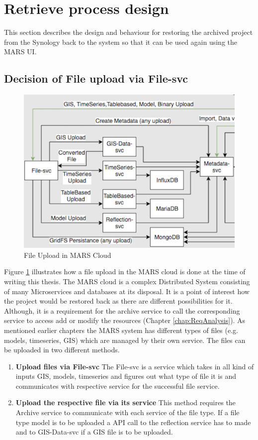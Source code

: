 \section{Retrieve process design}
This section describes the design and behaviour for restoring the archived project from the Synology back to the system
so that it can be used again using the MARS UI.   

\subsection{Decision of File upload via File-svc}

\begin{figure}[H]
    \centering \includegraphics[scale=0.6]{grafiken/mars-cloud.png}
    \caption{File Upload in MARS Cloud \cite{MARSCLoud}}
    \label{fig:MARSCloud}
\end{figure}

Figure \ref{fig:MARSCloud} illustrates how a file upload in the MARS cloud is done at the time of writing this thesis. 
The MARS cloud is a complex Distributed System consisting of many 
Microservices and databases at its disposal. It is a point of interest how the project would be restored back as there are different possibilities for it. 
Although, it is a requirement for the archive service
to call the corresponding service to access add or modify the resources (Chapter \ref{chap:ReqAnalysis}). As mentioned earlier chapters the MARS system
has different types of files (e.g. models, timeseries, GIS) which are managed by their own service. The files can be uploaded in two different methods.
\begin{enumerate}
 \item \textbf{Upload files via File-svc} The File-svc is a service which takes in all kind of inputs GIS, models, timeseries and figures out what type of
    file it is and communicates with respective service for the successful file service. 
 \item \textbf{Upload the respective file via its service} This method requires the Archive service to communicate with each service of the file type. If a file type
 model is to be uploaded a API call to the reflection service has to made and to GIS-Data-svc if a GIS file is to be uploaded.
\end{enumerate} 

